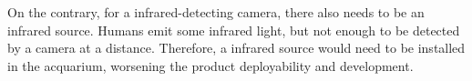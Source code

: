 On the contrary, for a infrared-detecting camera, there also needs to be an infrared source. Humans emit some infrared light, but not enough to be detected by a camera at a distance. Therefore, a infrared source would need to be installed in the acquarium, worsening the product deployability and development.
